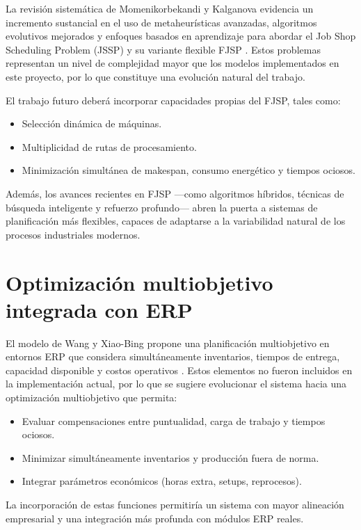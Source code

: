 La revisión sistemática de Momenikorbekandi y Kalganova evidencia un incremento sustancial 
en el uso de metaheurísticas avanzadas, algoritmos evolutivos mejorados y enfoques basados 
en aprendizaje para abordar el Job Shop Scheduling Problem (JSSP) y su variante flexible FJSP 
\cite{file_momeni_review}. Estos problemas representan un nivel de complejidad mayor que los 
modelos implementados en este proyecto, por lo que constituye una evolución natural del trabajo.

El trabajo futuro deberá incorporar capacidades propias del FJSP, tales como:
\begin{itemize}
    \item Selección dinámica de máquinas.
    \item Multiplicidad de rutas de procesamiento.
    \item Minimización simultánea de makespan, consumo energético y tiempos ociosos.
\end{itemize}

Además, los avances recientes en FJSP —como algoritmos híbridos, técnicas de búsqueda 
inteligente y refuerzo profundo— abren la puerta a sistemas de planificación más flexibles, 
capaces de adaptarse a la variabilidad natural de los procesos industriales modernos.

\section{Optimización multiobjetivo integrada con ERP}

El modelo de Wang y Xiao-Bing propone una planificación multiobjetivo en entornos ERP 
que considera simultáneamente inventarios, tiempos de entrega, capacidad disponible y 
costos operativos \cite{file_wang_erp}. Estos elementos no fueron incluidos en la implementación actual, 
por lo que se sugiere evolucionar el sistema hacia una optimización multiobjetivo que permita:

\begin{itemize}
    \item Evaluar compensaciones entre puntualidad, carga de trabajo y tiempos ociosos.
    \item Minimizar simultáneamente inventarios y producción fuera de norma.
    \item Integrar parámetros económicos (horas extra, setups, reprocesos).
\end{itemize}

La incorporación de estas funciones permitiría un sistema con mayor alineación empresarial 
y una integración más profunda con módulos ERP reales.

